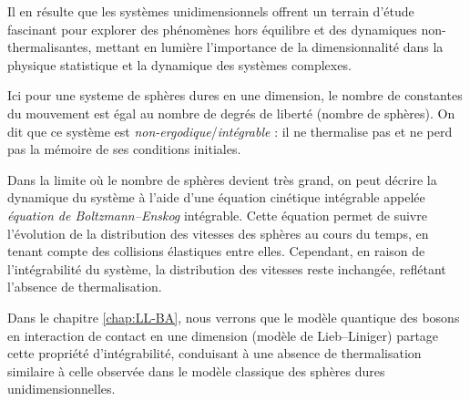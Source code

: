 \smallskip

Il en résulte que les systèmes unidimensionnels offrent un terrain d'étude fascinant pour explorer des phénomènes hors équilibre et des dynamiques non-thermalisantes, mettant en lumière l'importance de la dimensionnalité dans la physique statistique et la dynamique des systèmes complexes.

\smallskip

Ici pour une systeme de sphères dures en une dimension, le nombre de constantes du mouvement est égal au nombre de degrés de liberté (nombre de sphères). On dit que ce système est \emph{non-ergodique}/\emph{intégrable} : il ne thermalise pas et ne perd pas la mémoire de ses conditions initiales.

\smallskip

Dans la limite où le nombre de sphères devient très grand, on peut décrire la dynamique du système à l'aide d'une équation cinétique intégrable appelée \emph{équation de Boltzmann--Enskog} intégrable. Cette équation permet de suivre l'évolution de la distribution des vitesses des sphères au cours du temps, en tenant compte des collisions élastiques entre elles. Cependant, en raison de l'intégrabilité du système, la distribution des vitesses reste inchangée, reflétant l'absence de thermalisation.

\smallskip

Dans le chapitre \ref{chap:LL-BA}, nous verrons que le modèle quantique des bosons en interaction de contact en une dimension (modèle de Lieb--Liniger) partage cette propriété d'intégrabilité, conduisant à une absence de thermalisation similaire à celle observée dans le modèle classique des sphères dures unidimensionnelles.



